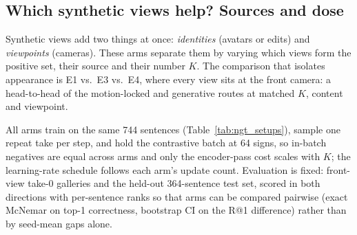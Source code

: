 \subsection{Which synthetic views help? Sources and dose}
\label{sec:ngt-synthetic-views}
Synthetic views add two things at once: \emph{identities} (avatars or
edits) and \emph{viewpoints} (cameras). These arms separate them by
varying which views form the positive set, their source and their number
$K$. The comparison that isolates appearance is E1 vs.\ E3 vs.\ E4, where
every view sits at the front camera: a head-to-head of the motion-locked
and generative routes at matched $K$, content and viewpoint.

All arms train on the same 744 sentences
(Table~\ref{tab:ngt_setups}), sample one repeat take per step, and hold
the contrastive batch at 64 signs, so in-batch negatives are equal across
arms and only the encoder-pass cost scales with $K$; the learning-rate
schedule follows each arm's update count. Evaluation is fixed: front-view
take-0 galleries and the held-out 364-sentence test set, scored in both
directions with per-sentence ranks so that arms can be compared pairwise
(exact McNemar on top-1 correctness, bootstrap CI on the R@1 difference)
rather than by seed-mean gaps alone.
